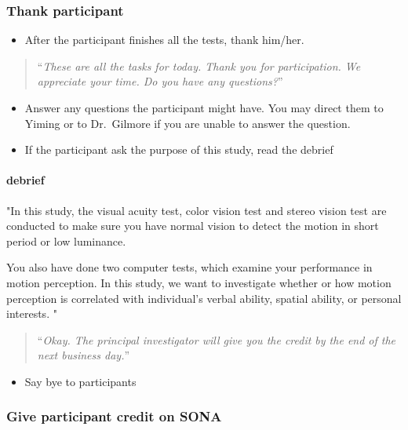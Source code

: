 \documentclass[]{article}
\providecommand{\tightlist}{%
  \setlength{\itemsep}{0pt}\setlength{\parskip}{0pt}}
\let\oldparagraph\paragraph
\renewcommand{\paragraph}[1]{\oldparagraph{#1}\mbox{}}
\begin{document}
\hypertarget{thank-participant}{%
\subsubsection{Thank participant}\label{thank-participant}}

\begin{itemize}
\tightlist
\item
  After the participant finishes all the tests, thank him/her.
\end{itemize}

\begin{quote}
``\emph{These are all the tasks for today. Thank you for participation.
We appreciate your time. Do you have any questions?}''
\end{quote}

\begin{itemize}
\tightlist
\item
  Answer any questions the participant might have. You may direct them
  to Yiming or to Dr.~Gilmore if you are unable to answer the question.
\item
  If the participant ask the purpose of this study, read the debrief
\end{itemize}

\hypertarget{debrief}{%
\paragraph{debrief}\label{debrief}}

"In this study, the visual acuity test, color vision test and stereo
vision test are conducted to make sure you have normal vision to detect
the motion in short period or low luminance.

You also have done two computer tests, which examine your performance in
motion perception. In this study, we want to investigate whether or how
motion perception is correlated with individual's verbal ability,
spatial ability, or personal interests. "

\begin{quote}
``\emph{Okay. The principal investigator will give you the credit by the
end of the next business day.}''
\end{quote}

\begin{itemize}
\tightlist
\item
  Say bye to participants
\end{itemize}

\hypertarget{give-participant-credit-on-sona}{%
\subsubsection{Give participant credit on
SONA}\label{give-participant-credit-on-sona}}
\end{document}
